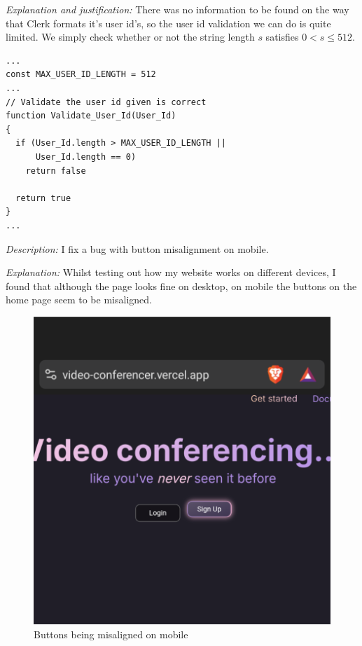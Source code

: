 \textit{Explanation and justification:} There was no information
to be found on the way that Clerk formats it's user id's, so the
user id validation we can do is quite limited. We simply check
whether or not the string length $s$ satisfies $0 < s \leq 512$.
\\ \vspace{0.2cm}

\begin{verbatim}
...
const MAX_USER_ID_LENGTH = 512
...
// Validate the user id given is correct
function Validate_User_Id(User_Id)
{
  if (User_Id.length > MAX_USER_ID_LENGTH ||
      User_Id.length == 0)
    return false

  return true
}
...
\end{verbatim}

\textit{Description:} I fix a bug with button misalignment on
mobile. \\ \vspace{0.2cm}

\textit{Explanation:} Whilst testing out how my website works
on different devices, I found that although the page looks
fine on desktop, on mobile the buttons on the home page seem
to be misaligned. \\

\begin{figure}[h]
\centering

\includegraphics[scale=0.2]{Images/Button_misalignment.png}

\caption{Buttons being misaligned on mobile}
\end{figure}


